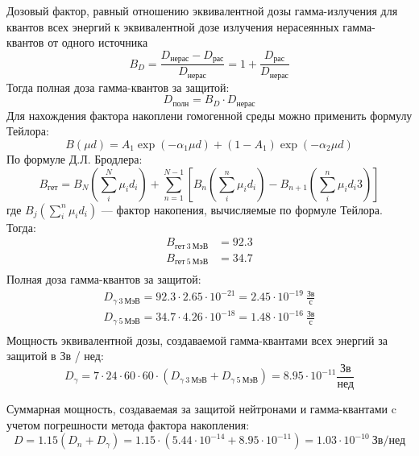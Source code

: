 Дозовый фактор, равный отношению эквивалентной дозы гамма-излучения для квантов всех энергий к эквивалентной дозе излучения нерасеянных гамма-квантов от одного источника
\begin{equation}
        B_D = \frac{D_{\text{нерас}} - D_{\text{рас}}}{D_{\text{нерас}}} = 1 + \frac{D_{\text{рас}}}{D_{\text{нерас}}}
\end{equation}
Тогда полная доза гамма-квантов за защитой:
\begin{equation}
        D_{\text{полн}} = B_D\cdot D_{\text{нерас}}
\end{equation}
Для нахождения фактора накоплени гомогенной среды можно применить формулу Тейлора:
\begin{equation}
        B(\mu d) = A_1\exp(-\alpha_1 \mu d) + (1 - A_1)\exp(- \alpha_2 \mu d)
\end{equation}
По формуле Д.Л. Бродлера:
\begin{equation}
        B_{ \text{гет} } =
        B_N \left( \sum_i^N \mu_i d_i \right)
        + \sum_{ n = 1 }^{ N - 1 } \left[
                B_n \left( \sum_i^n \mu_i d_i \right) 
                - B_{ n + 1 } \left( \sum_i^n \mu_i d_i3\right)
        \right]
\end{equation}
\noindent где $B_j \left( \sum_i^n\mu_i d_i \right)$ — фактор накопения, вычисляемые по формуле Тейлора. Тогда:
\begin{align*}
        B_{\text{гет}\ 3\ \text{МэВ}} &= 92.3 \\
        B_{\text{гет}\ 5\ \text{МэВ}} &= 34.7 \\
\end{align*}
\noindent Полная доза гамма-квантов за защитой:
\begin{align*}
        D_{\gamma\ 3\ \text{МэВ}} = 92.3 \cdot 2.65 \cdot 10^{ - 21}= 2.45 \cdot 10^{-19}\ \frac{\text{Зв}}{\text{с}}\\
        D_{\gamma\ 5\ \text{МэВ}} = 34.7 \cdot 4.26 \cdot 10^{ - 18}= 1.48 \cdot 10^{- 16 }\ \frac{\text{Зв}}{\text{с}}\\
\end{align*}
Мощность эквивалентной дозы, создаваемой гамма-квантами всех энергий за защитой в Зв / нед:
$$
D_\gamma = 7 \cdot 24 \cdot 60 \cdot 60 \cdot (D_{\gamma\ 3\ \text{МэВ}} + D_{\gamma\ 5\ \text{МэВ}}) = 8.95 \cdot 10^{ - 11 } \frac{\text{Зв}}{\text{нед}}
$$

Суммарная мощность, создаваемая за защитой нейтронами и гамма-квантами c учетом погрешности метода фактора накопления:
$$
D = 1.15(D_n + D_\gamma) = 1.15 \cdot (5.44 \cdot 10^{-14} + 8.95 \cdot 10^{-11}) = 1.03 
\cdot 10^{- 10}\ \text{Зв} / \text{нед}
$$

